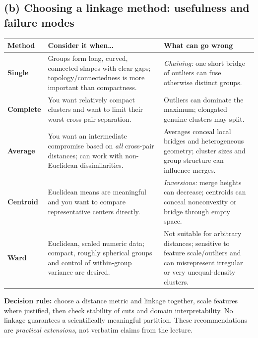 \subsection*{(b) Choosing a linkage method: usefulness and failure modes}
\begin{center}\small
\renewcommand{\arraystretch}{1.22}
\begin{tabularx}{\textwidth}{@{}p{1.8cm}X X@{}}\toprule
Method & Consider it when\ldots & What can go wrong\\\midrule
\textbf{Single} & Groups form long, curved, connected shapes with clear gaps; topology/connectedness is more important than compactness. & \emph{Chaining:} one short bridge of outliers can fuse otherwise distinct groups. \\
\textbf{Complete} & You want relatively compact clusters and want to limit their worst cross-pair separation. & Outliers can dominate the maximum; elongated genuine clusters may split.\\
\textbf{Average} & You want an intermediate compromise based on \emph{all} cross-pair distances; can work with non-Euclidean dissimilarities. & Averages conceal local bridges and heterogeneous geometry; cluster sizes and group structure can influence merges.\\
\textbf{Centroid} & Euclidean means are meaningful and you want to compare representative centers directly. & \emph{Inversions:} merge heights can decrease; centroids can conceal nonconvexity or bridge through empty space.\\
\textbf{Ward} & Euclidean, scaled numeric data; compact, roughly spherical groups and control of within-group variance are desired. & Not suitable for arbitrary distances; sensitive to feature scale/outliers and can misrepresent irregular or very unequal-density clusters.\\\bottomrule
\end{tabularx}
\end{center}
\textbf{Decision rule:} choose a distance metric and linkage together, scale features where justified, then check stability of cuts and domain interpretability. No linkage guarantees a scientifically meaningful partition. These recommendations are \emph{practical extensions}, not verbatim claims from the lecture.

